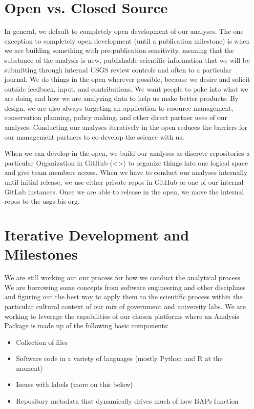 \documentclass[letterpaper,10pt,english]{sphinxmanual}
\begin{document}
\section{Open vs. Closed Source}
\label{\detokenize{baps:open-vs-closed-source}}
In general, we default to completely open development of our analyses. The one exception to completely open development (until a publication milestone) is when we are building something with pre-publication sensitivity, meaning that the substance of the analysis is new, publishable scientific information that we will be submitting through internal USGS review controls and often to a particular journal. We do things in the open wherever possible, because we desire and solicit outside feedback, input, and contributions. We want people to poke into what we are doing and how we are analyzing data to help us make better products. By design, we are also always targeting an application to resource management, conservation planning, policy making, and other direct partner uses of our analyses. Conducting our analyses iteratively in the open reduces the barriers for our management partners to co-develop the science with us.

When we can develop in the open, we build our analyses as discrete repositories a particular Organization in GitHub (\textless{}\textgreater{}) to organize things into one logical space and give team members access. When we have to conduct our analyses internally until initial release, we use either private repos in GitHub or one of our internal GitLab instances. Once we are able to release in the open, we move the internal repos to the usgs-bis org.


\section{Iterative Development and Milestones}
\label{\detokenize{baps:iterative-development-and-milestones}}
We are still working out our process for how we conduct the analytical process. We are borrowing some concepts from software engineering and other disciplines and figuring out the best way to apply them to the scientific process within the particular cultural context of our mix of government and university labs. We are working to leverage the capabilities of our chosen platforms where an Analysis Package is made up of the following basic components:
\begin{itemize}
\item {} 
Collection of files

\item {} 
Software code in a variety of languages (mostly Python and R at the moment)

\item {} 
Issues with labels (more on this below)

\item {} 
Repository metadata that dynamically drives much of how BAPs function

\end{itemize}
\end{document}
